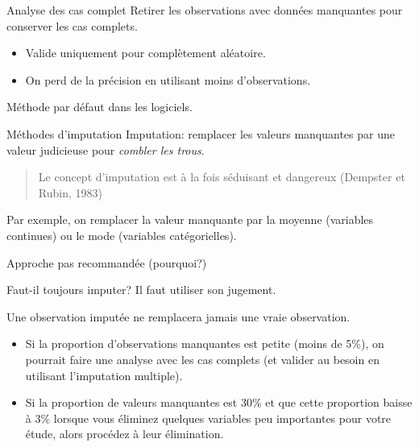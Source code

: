 \documentclass[
  ignorenonframetext,
]{beamer}
\providecommand{\tightlist}{%
  \setlength{\itemsep}{0pt}\setlength{\parskip}{0pt}}\usepackage{longtable,booktabs,array}
\begin{document}
\begin{frame}{Analyse des cas complet}
\protect\hypertarget{analyse-des-cas-complet}{}
Retirer les observations avec données manquantes pour conserver les cas
complets.

\begin{itemize}
\tightlist
\item
  Valide uniquement pour complètement aléatoire.
\item
  On perd de la précision en utilisant moins d'observations.
\end{itemize}

Méthode par défaut dans les logiciels.
\end{frame}

\begin{frame}{Méthodes d'imputation}
\protect\hypertarget{muxe9thodes-dimputation}{}
Imputation: remplacer les valeurs manquantes par une valeur judicieuse
pour \emph{combler les trous}.

\begin{quote}
Le concept d'imputation est à la fois séduisant et dangereux (Dempster
et Rubin, 1983)
\end{quote}

Par exemple, on remplacer la valeur manquante par la moyenne (variables
continues) ou le mode (variables catégorielles).

Approche pas recommandée (pourquoi?)
\end{frame}

\begin{frame}{Faut-il toujours imputer?}
\protect\hypertarget{faut-il-toujours-imputer}{}
Il faut utiliser son jugement.

Une observation imputée ne remplacera jamais une vraie observation.

\begin{itemize}
\tightlist
\item
  Si la proportion d'observations manquantes est petite (moins de 5\%),
  on pourrait faire une analyse avec les cas complets (et valider au
  besoin en utilisant l'imputation multiple).
\item
  Si la proportion de valeurs manquantes est 30\% et que cette
  proportion baisse à 3\% lorsque vous éliminez quelques variables peu
  importantes pour votre étude, alors procédez à leur élimination.
\end{itemize}
\end{frame}
\end{document}
